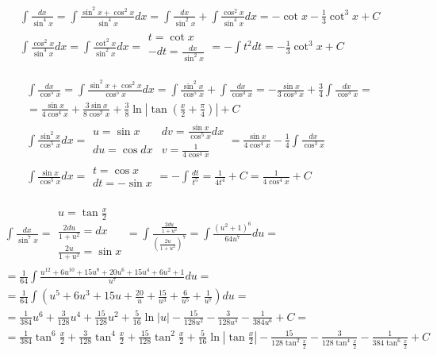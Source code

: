 
\begin{gather*}\int \frac{dx}{\sin^4 x} = \int \frac{\sin^2x+\cos^2x}{\sin^4 x}dx=\int \frac{dx}{\sin^2x}+\int \frac{\cos^2x}{\sin^4x}dx = -\cot x - \frac{1}{3}\cot^3 x + C  \\
\int \frac{\cos^2x}{\sin^4x}dx = \int \frac{\cot^2 x}{\sin^2 x}dx = \begin{array}{|l|} t=\cot x \\ -dt=\frac{dx}{\sin^2 x} \end{array} = -\int t^2dt = -\frac{1}{3}\cot^3x+C\end{gather*}



\begin{gather*}\int \frac{dx}{\cos^5 x} = \int \frac{\sin^2 x+\cos^2 x}{\cos^5 x}dx = \int \frac{\sin^2 x}{\cos^5 x}+\int \frac{dx}{\cos^3 x} = -\frac{\sin x}{3\cos^3 x} + \frac{3}{4}\int \frac{dx}{\cos^3 x} =  \\
= \frac{\sin x}{4\cos^4 x}+\frac{3\sin x}{8\cos^2 x} + \frac{3}{8}\ln|\tan(\frac{x}{2}+\frac{\pi}{4})|+C \\
\int \frac{\sin^2 x}{\cos^5 x}dx = \begin{array}{|ll|}
u=\sin x & dv=\frac{\sin x}{\cos^5 x}dx \\
du=\cos dx & v=\frac{1}{4\cos^4 x} \end{array} = \frac{\sin x}{4\cos^4 x} - \frac{1}{4}\int \frac{dx}{\cos^3 x} \\
\int \frac{\sin x}{\cos^5 x}dx = \begin{array}{|l|} t=\cos x \\ dt=-\sin x \end{array} = -\int \frac{dt}{t^5} = \frac{1}{4t^4}+C = \frac{1}{4\cos^4 x}+C\end{gather*}




\begin{gather*}\int \frac{dx}{\sin^7 x} = \begin{array}{|l|}
u=\tan \frac{x}{2} \\
\frac{2du}{1+u^2}=dx \\
\frac{2u}{1+u^2}=\sin x \end{array} = \int \frac{\frac{2du}{1+u^2}}{(\frac{2u}{1+u^2})^7} = \int \frac{(u^2+1)^6}{64u^7}du = \\
= \frac{1}{64} \int \frac{u^{12}+6u^{10}+15u^8+20u^6+15u^4+6u^2+1}{u^7}du = \\
= \frac{1}{64} \int \left(u^5+6u^3+15u+\frac{20}{u}+\frac{15}{u^3}+\frac{6}{u^5}+\frac{1}{u^7}\right)du = \\
= \frac{1}{384}u^6+\frac{3}{128}u^4+\frac{15}{128}u^2+\frac{5}{16}\ln|u| -\frac{15}{128u^2}-\frac{3}{128u^4}-\frac{1}{384u^6}+C = \\
 = \frac{1}{384}\tan^6\frac{x}{2}+\frac{3}{128}\tan^4\frac{x}{2} +\frac{15}{128}\tan^2\frac{x}{2}+\frac{5}{16}\ln|\tan\frac{x}{2}| -\frac{15}{128\tan^2\frac{x}{2}}-\frac{3}{128\tan^4\frac{x}{2}}- \frac{1}{384\tan^6\frac{x}{2}}+C
\end{gather*}


